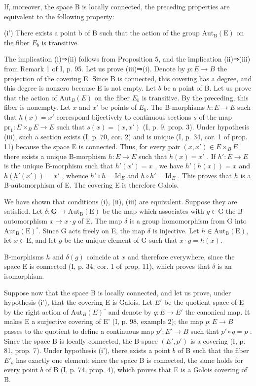 If, moreover, the space B is locally connected, the preceding properties are equivalent to the following property:

(i') There exists a point b of B such that the action of the group \(\mathrm{Aut}_{\mathrm{B}}(\mathrm{E})\) on the fiber \(E_{b}\) is transitive.

The implication (i)⇒(ii) follows from Proposition 5, and the implication (ii)⇒(iii) from Remark 1 of I, p. 95. Let us prove (iii)⇒(i). Denote by \(p\colon E \to B\) the projection of the covering E. Since B is connected, this covering has a degree, and this degree is nonzero because E is not empty. Let \(b\) be a point of B. Let us prove that the action of \(\mathrm{Aut}_{B}(E)\) on the fiber \(E_{b}\) is transitive. By the preceding, this fiber is nonempty. Let \(x\) and \(x'\) be points of \(E_{b}\). The B-morphisms \(h\colon E \to E\) such that \(h(x) = x'\) correspond bijectively to continuous sections \(s\) of the map \(\mathrm{pr}_{1}\colon E \times_{B} E \to E\) such that \(s(x) = (x, x')\) (I, p. 9, prop. 3). Under hypothesis (iii), such a section exists (I, p. 70, cor. 2) and is unique (I, p. 34, cor. 1 of prop. 11) because the space E is connected. Thus, for every pair \((x, x') \in E \times_{B} E\) there exists a unique B-morphism \(h\colon E \to E\) such that \(h(x) = x'\) . If \(h'\colon E \to E\) is the unique B-morphism such that \(h'(x') = x\) , we have \(h'(h(x)) = x\) and \(h(h'(x')) = x'\) , whence \(h' \circ h = \text{Id}_E\) and \(h \circ h' = \text{Id}_E\) . This proves that \(h\) is a B-automorphism of E. The covering E is therefore Galois.

We have shown that conditions (i), (ii), (iii) are equivalent. Suppose they are satisfied. Let \(\delta\colon\mathbf{G}\to\mathrm{Aut}_{\mathrm{B}}(\mathrm{E})\) be the map which associates with \(g\in\mathrm{G}\) the B-automorphism \(x\mapsto x\cdot g\) of E. The map \(\delta\) is a group homomorphism from G into \(\mathrm{Aut}_{\mathrm{B}}(\mathrm{E})^{\circ}\). Since G acts freely on E, the map \(\delta\) is injective. Let \(h\in\mathrm{Aut}_{\mathrm{B}}(\mathrm{E})\), let \(x\in\mathrm{E}\), and let \(g\) be the unique element of G such that \(x\cdot g=h(x)\).

B-morphisms \(h\) and \(\delta(g)\) coincide at \(x\) and therefore everywhere, since the space E is connected (I, p. 34, cor. 1 of prop. 11), which proves that \(\delta\) is an isomorphism.

Suppose now that the space B is locally connected, and let us prove, under hypothesis (i'), that the covering E is Galois. Let \(E'\) be the quotient space of E by the right action of \(\mathrm{Aut}_{B}(E)^{\circ}\) and denote by \(q\colon E \to E'\) the canonical map. It makes E a surjective covering of E' (I, p. 98, example 2); the map \(p\colon E \to B\) passes to the quotient to define a continuous map \(p'\colon E' \to B\) such that \(p'\circ q = p\) . Since the space B is locally connected, the B-space \((E', p')\) is a covering (I, p. 81, prop. 7). Under hypothesis (i'), there exists a point \(b\) of B such that the fiber \(E'_{b}\) has exactly one element; since the space B is connected, the same holds for every point \(b\) of B (I, p. 74, prop. 4), which proves that E is a Galois covering of B.

